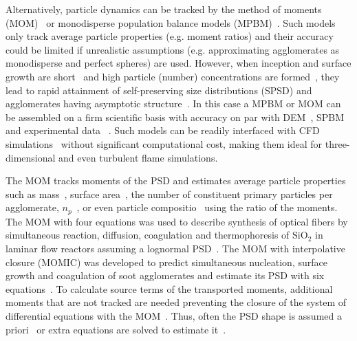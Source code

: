 Alternatively, particle dynamics can be tracked by the method of moments (MOM)~\citep{kazakov1998dynamic} or monodisperse population balance models (MPBM)~\citep{kruis1993simple}. Such models only track average particle properties (e.g. moment ratios) and their accuracy could be limited if unrealistic assumptions (e.g. approximating agglomerates as monodisperse and perfect spheres) are used. However, when inception and surface growth are short~\citep{Spicer2002} and high particle (number) concentrations are formed~\cite{Kelesidis2017}, they lead to rapid attainment of self-preserving size distributions (SPSD) and agglomerates having asymptotic structure~\citep{Goudeli2016}. In this case a MPBM or MOM can be assembled on a firm scientific basis with accuracy on par with DEM~\citep{Kelesidis2017Flame}, SPBM~\citep{kelesidis2019estimating} and experimental data ~\citep{abid2008evolution, ma2013soot, camacho2015mobility}. Such models can be readily interfaced with CFD simulations~\citep{grohn2012fluid} without significant computational cost, making them ideal for three-dimensional and even turbulent flame simulations. 

The MOM tracks moments of the PSD and estimates average particle properties such as mass~\citep{pratsinis1988simultaneous}, surface area~\citep{blanquart2009joint}, the number of constituent primary particles per agglomerate, ${n_p}$~\citep{kazakov1998dynamic}, or even particle compositio~\citep{blanquart2009analyzing} using the ratio of the moments. The MOM with four equations was used to describe synthesis of optical fibers by simultaneous reaction, diffusion, coagulation and thermophoresis of $\mathrm{SiO_2}$ in laminar flow reactors assuming a lognormal PSD~\citep{kim1988manufacture}. The MOM with interpolative closure (MOMIC) was developed to predict simultaneous nucleation, surface growth and coagulation of soot agglomerates and estimate its PSD with six equations~\citep{kazakov1998dynamic}. To calculate source terms of the transported moments, additional moments that are not tracked are needed preventing the closure of the system of differential equations with the MOM~\citep{pratsinis1988simultaneous, frenklach1987aerosol}. Thus, often the PSD shape is assumed a priori~\citep{pratsinis1988simultaneous} or extra equations are solved to estimate it~\citep{kruis1993simple}.

